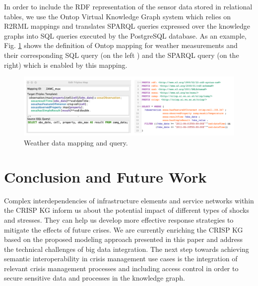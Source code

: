 \documentclass[
]{ceurart}
\begin{document}
In order to include the RDF representation of the sensor data stored in relational tables, we use the Ontop Virtual Knowledge Graph system \cite{xiao2020virtual} which relies on R2RML mappings and translates SPARQL queries expressed over the knowledge graphs into SQL queries executed by the PostgreSQL database. As an example, Fig. \ref{zamg_mapping} shows the definition of Ontop mapping for weather measurements and their corresponding SQL query (on the left ) and the SPARQL query (on the right) which is enabled by this mapping.  


\begin{figure}
  \centering
  \includegraphics[width=\linewidth]{images/ZAMG_mapping.png}
  \caption{Weather data mapping and query.}
  \label{zamg_mapping}
\end{figure}



\section{Conclusion and Future Work}

Complex interdependencies of infrastructure elements and service networks within the CRISP KG inform us about the potential impact of different types of shocks and stresses. They can help us develop more effective response strategies to mitigate the effects of future crises. We are currently enriching the CRISP KG based on the proposed modeling approach presented in this paper and address the technical challenges of big data integration. The next step towards achieving semantic interoperability in crisis management use cases is the integration of relevant crisis management processes and including access control in order to secure sensitive data and processes in the knowledge graph.




\begin{acknowledgments}
\end{acknowledgments}



\appendix
\end{document}
